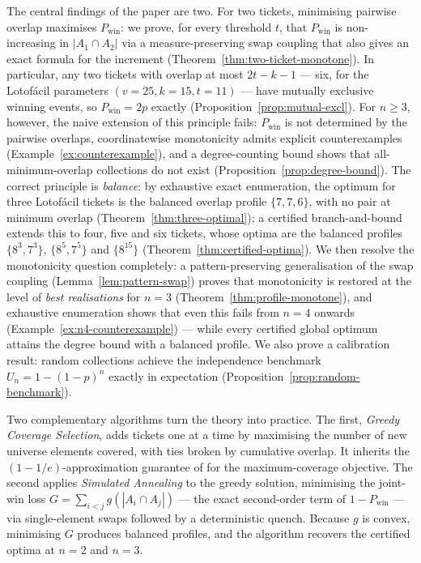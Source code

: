 The central findings of the paper are two.  For two tickets, minimising
pairwise overlap maximises $P_{\mathrm{win}}$: we prove, for every
threshold $t$, that $P_{\mathrm{win}}$ is non-increasing in
$|A_1 \cap A_2|$ via a measure-preserving swap coupling that also gives an
exact formula for the increment (Theorem~\ref{thm:two-ticket-monotone}).
In particular, any two tickets with overlap at most $2t-k-1$ --- six, for
the Lotof\'{a}cil parameters $(v=25,k=15,t=11)$ --- have mutually
exclusive winning events, so $P_{\mathrm{win}} = 2p$ exactly
(Proposition~\ref{prop:mutual-excl}).  For $n \ge 3$, however, the naive
extension of this principle fails: $P_{\mathrm{win}}$ is not determined by
the pairwise overlaps, coordinatewise monotonicity admits explicit
counterexamples (Example~\ref{ex:counterexample}), and a degree-counting
bound shows that all-minimum-overlap collections do not exist
(Proposition~\ref{prop:degree-bound}).  The correct principle is
\emph{balance}: by exhaustive exact enumeration, the optimum for three
Lotof\'{a}cil tickets is the balanced overlap profile $\{7,7,6\}$, with no
pair at minimum overlap (Theorem~\ref{thm:three-optimal}); a certified
branch-and-bound extends this to four, five and six tickets, whose optima
are the balanced profiles $\{8^3,7^3\}$, $\{8^5,7^5\}$ and $\{8^{15}\}$
(Theorem~\ref{thm:certified-optima}).  We then
resolve the monotonicity question completely: a pattern-preserving
generalisation of the swap coupling (Lemma~\ref{lem:pattern-swap}) proves
that monotonicity is restored at the level of \emph{best realisations}
for $n = 3$ (Theorem~\ref{thm:profile-monotone}), and exhaustive
enumeration shows that even this fails from $n = 4$ onwards
(Example~\ref{ex:n4-counterexample}) --- while every certified global
optimum attains the degree bound with a balanced profile.  We also prove a calibration result: random
collections achieve the independence benchmark $U_n = 1-(1-p)^n$ exactly
in expectation (Proposition~\ref{prop:random-benchmark}).

Two complementary algorithms turn the theory into practice.  The first,
\emph{Greedy Coverage Selection}, adds tickets one at a time by maximising
the number of new universe elements covered, with ties broken by
cumulative overlap.  It inherits the $(1-1/e)$-approximation guarantee of
\citet{Nemhauser1978} for the maximum-coverage objective.  The second
applies \emph{Simulated Annealing} \cite{Kirkpatrick1983} to the greedy
solution, minimising the joint-win loss $G = \sum_{i<j} g(|A_i \cap A_j|)$
--- the exact second-order term of $1 - P_{\mathrm{win}}$ --- via
single-element swaps followed by a deterministic quench.  Because $g$ is
convex, minimising $G$ produces balanced profiles, and the algorithm
recovers the certified optima at $n = 2$ and $n = 3$.

